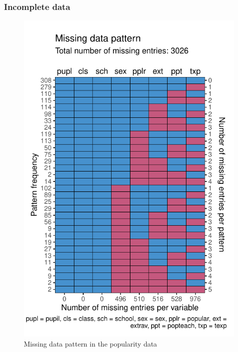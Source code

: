 \documentclass[
]{jss}
\begin{document}
\hypertarget{incomplete-data}{%
\subsubsection{Incomplete data}\label{incomplete-data}}

\begin{CodeChunk}
\begin{figure}

{\centering \includegraphics{Manuscript_files/figure-latex/pop_pat-1} 

}

\caption[Missing data pattern in the popularity data]{Missing data pattern in the popularity data}\label{fig:pop_pat}
\end{figure}
\end{CodeChunk}
\end{document}
